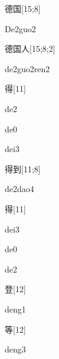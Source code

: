 \begin{verbete}[De2guo2]{德国}[15;8]
\begin{pronuncia}{De2guo2}
\end{pronuncia}
\end{verbete}

\begin{verbete}{德国人}[15;8;2]
\begin{pronuncia}{de2guo2ren2}
\end{pronuncia}
\end{verbete}

\begin{verbete}[de2]{得}[11]
\begin{pronuncia}{de2}
\end{pronuncia}
\begin{pronuncia}{de0}
\end{pronuncia}
\begin{pronuncia}{dei3}
\end{pronuncia}
\end{verbete}

\begin{verbete}[de2dao4]{得到}[11;8]
\begin{pronuncia}{de2dao4}
\end{pronuncia}
\end{verbete}

\begin{verbete}[dei3]{得}[11]
\begin{pronuncia}{dei3}
\end{pronuncia}
\begin{pronuncia}{de0}
\end{pronuncia}
\begin{pronuncia}{de2}
\end{pronuncia}
\end{verbete}

\begin{verbete}[deng1]{登}[12]
\begin{pronuncia}{deng1}
\end{pronuncia}
\end{verbete}

\begin{verbete}[deng3]{等}[12]
\begin{pronuncia}{deng3}
\end{pronuncia}
\end{verbete}

